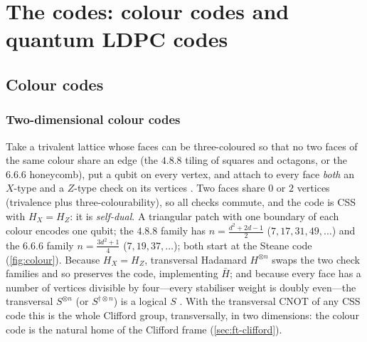\section{The codes: colour codes and quantum LDPC codes}\label{sec:codes2}

\subsection{Colour codes}\label{sec:colour}

\subsubsection{Two-dimensional colour codes}
Take a trivalent lattice whose faces can be three-coloured so that no two faces of the same colour share an edge (the $4.8.8$ tiling of squares and octagons, or the $6.6.6$ honeycomb), put a qubit on every vertex, and attach to every face \emph{both} an $X$-type and a $Z$-type check on its vertices \cite{bombin06}. Two faces share $0$ or $2$ vertices (trivalence plus three-colourability), so all checks commute, and the code is CSS with $H_X=H_Z$: it is \emph{self-dual}. A triangular patch with one boundary of each colour encodes one qubit; the $4.8.8$ family has $n=\frac{d^2+2d-1}2$ ($7,17,31,49,\dots$) and the $6.6.6$ family $n=\frac{3d^2+1}4$ ($7,19,37,\dots$); both start at the Steane code (\cref{fig:colour}). Because $H_X=H_Z$, transversal Hadamard $H^{\otimes n}$ swaps the two check families and so preserves the code, implementing $\bar H$; and because every face has a number of vertices divisible by four---every stabiliser weight is doubly even---the transversal $S^{\otimes n}$ (or $S^{\dagger\otimes n}$) is a logical $S$ \cite{kubica15}. With the transversal CNOT of any CSS code this is the whole Clifford group, transversally, in two dimensions: the colour code is the natural home of the Clifford frame (\cref{sec:ft-clifford}).

